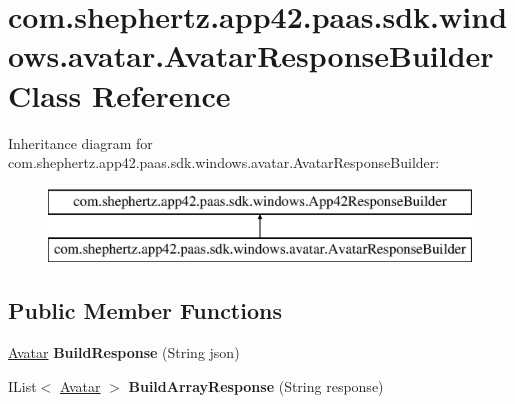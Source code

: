 \hypertarget{classcom_1_1shephertz_1_1app42_1_1paas_1_1sdk_1_1windows_1_1avatar_1_1_avatar_response_builder}{\section{com.\+shephertz.\+app42.\+paas.\+sdk.\+windows.\+avatar.\+Avatar\+Response\+Builder Class Reference}
\label{classcom_1_1shephertz_1_1app42_1_1paas_1_1sdk_1_1windows_1_1avatar_1_1_avatar_response_builder}
}
Inheritance diagram for com.\+shephertz.\+app42.\+paas.\+sdk.\+windows.\+avatar.\+Avatar\+Response\+Builder\+:\begin{figure}[H]
\begin{center}
\leavevmode
\includegraphics[height=2.000000cm]{classcom_1_1shephertz_1_1app42_1_1paas_1_1sdk_1_1windows_1_1avatar_1_1_avatar_response_builder}
\end{center}
\end{figure}
\subsection*{Public Member Functions}
\begin{DoxyCompactItemize}
\item 
\hypertarget{classcom_1_1shephertz_1_1app42_1_1paas_1_1sdk_1_1windows_1_1avatar_1_1_avatar_response_builder_a6de015ae7e7cacdb1c6d9eaef1e7b5a7}{\hyperlink{classcom_1_1shephertz_1_1app42_1_1paas_1_1sdk_1_1windows_1_1avatar_1_1_avatar}{Avatar} {\bfseries Build\+Response} (String json)}\label{classcom_1_1shephertz_1_1app42_1_1paas_1_1sdk_1_1windows_1_1avatar_1_1_avatar_response_builder_a6de015ae7e7cacdb1c6d9eaef1e7b5a7}

\item 
\hypertarget{classcom_1_1shephertz_1_1app42_1_1paas_1_1sdk_1_1windows_1_1avatar_1_1_avatar_response_builder_aecb38a3029776df2f72ccc0dc83bf729}{I\+List$<$ \hyperlink{classcom_1_1shephertz_1_1app42_1_1paas_1_1sdk_1_1windows_1_1avatar_1_1_avatar}{Avatar} $>$ {\bfseries Build\+Array\+Response} (String response)}\label{classcom_1_1shephertz_1_1app42_1_1paas_1_1sdk_1_1windows_1_1avatar_1_1_avatar_response_builder_aecb38a3029776df2f72ccc0dc83bf729}

\end{DoxyCompactItemize}
